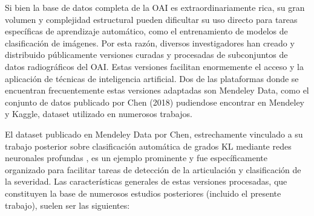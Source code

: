 \documentclass[11pt,spanish,listoffigures,listoftables]{tfgetsinf}
\begin{document}
Si bien la base de datos completa de la OAI es extraordinariamente rica, su gran volumen y complejidad estructural pueden dificultar su uso directo para tareas específicas de 
aprendizaje automático, como el entrenamiento de modelos de clasificación de imágenes. Por esta razón, diversos investigadores han creado y distribuido públicamente 
versiones curadas y procesadas de subconjuntos de datos radiográficos del OAI. Estas versiones facilitan enormemente el acceso y la aplicación de técnicas de inteligencia 
artificial. Dos de las plataformas donde se encuentran frecuentemente estas versiones adaptadas son Mendeley Data, como el conjunto de datos publicado por Chen (2018) 
\cite{chen2018knee} pudiendose encontrar en Mendeley y Kaggle, dataset utilizado en numerosos trabajos.

El dataset publicado en Mendeley Data por Chen, estrechamente vinculado a su trabajo posterior sobre clasificación automática de grados KL mediante 
redes neuronales profundas \cite{chen2019fully}, es un ejemplo prominente y fue específicamente organizado para facilitar tareas de detección de la articulación y clasificación 
de la severidad. Las características generales de estas versiones procesadas, que constituyen la base de numerosos estudios posteriores (incluido el presente trabajo), suelen ser 
las siguientes:
\end{document}
